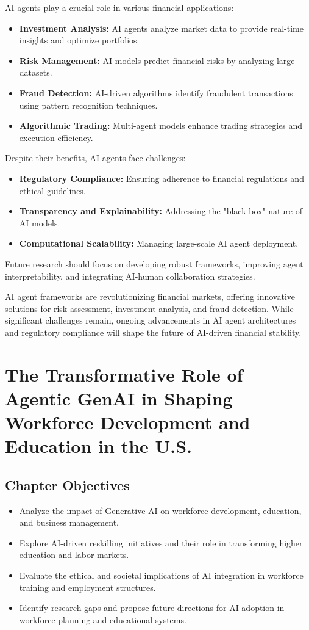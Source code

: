 \documentclass[a4paper,headinclude=on,footinclude=on,12pt,oneside]{scrbook}
\begin{document}
AI agents play a crucial role in various financial applications:
\begin{itemize}
	\item \textbf{Investment Analysis:} AI agents analyze market data to provide real-time insights and optimize portfolios.
	\item \textbf{Risk Management:} AI models predict financial risks by analyzing large datasets.
	\item \textbf{Fraud Detection:} AI-driven algorithms identify fraudulent transactions using pattern recognition techniques.
	\item \textbf{Algorithmic Trading:} Multi-agent models enhance trading strategies and execution efficiency.
\end{itemize}

Despite their benefits, AI agents face challenges:
\begin{itemize}
	\item \textbf{Regulatory Compliance:} Ensuring adherence to financial regulations and ethical guidelines.
	\item \textbf{Transparency and Explainability:} Addressing the "black-box" nature of AI models.
	\item \textbf{Computational Scalability:} Managing large-scale AI agent deployment.
\end{itemize}
Future research should focus on developing robust frameworks, improving agent interpretability, and integrating AI-human collaboration strategies.

AI agent frameworks are revolutionizing financial markets, offering innovative solutions for risk assessment, investment analysis, and fraud detection. While significant challenges remain, ongoing advancements in AI agent architectures and regulatory compliance will shape the future of AI-driven financial stability.




\chapter{The Transformative Role of Agentic GenAI in Shaping Workforce Development and Education in the U.S.}

\section*{Chapter Objectives}
\begin{itemize}
	\item Analyze the impact of Generative AI on workforce development, education, and business management.
	\item Explore AI-driven reskilling initiatives and their role in transforming higher education and labor markets.
	\item Evaluate the ethical and societal implications of AI integration in workforce training and employment structures.
	\item Identify research gaps and propose future directions for AI adoption in workforce planning and educational systems.
\end{itemize}
\end{document}

